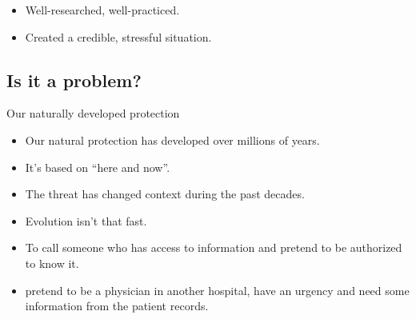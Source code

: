 \begin{frame}
  \begin{remark}
    \begin{itemize}
      \item Well-researched, well-practiced.
      \item Created a credible, stressful situation.
    \end{itemize}
  \end{remark}
\end{frame}

\subsection{Is it a problem?}

\begin{frame}
  \begin{block}{Our naturally developed protection}
    \begin{itemize}
      \item Our natural protection has developed over millions of years.
      \item It's based on \enquote{here and now}.
      \item The threat has changed context during the past decades.
      \item Evolution isn't that fast.
    \end{itemize}
  \end{block}
\end{frame}

\begin{frame}
  \begin{definition}[Pretexting]
    \begin{itemize}
      \item To call someone who has access to information and pretend to be 
        authorized to know it.
    \end{itemize}
  \end{definition}

  \pause

  \begin{example}
    \begin{itemize}
      \item \Eg pretend to be a physician in another hospital, have an urgency 
        and need some information from the patient records.
    \end{itemize}
  \end{example}
\end{frame}

